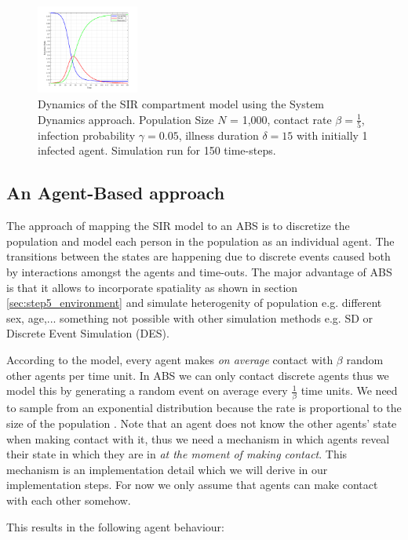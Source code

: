 \begin{figure}
	\centering
	\includegraphics[width=0.3\textwidth, angle=0]{./fig/SD/SIR_SD_1000agents_150t_001dt.png}
	\caption{Dynamics of the SIR compartment model using the System Dynamics approach. Population Size $N$ = 1,000, contact rate $\beta =  \frac{1}{5}$, infection probability $\gamma = 0.05$, illness duration $\delta = 15$ with initially 1 infected agent. Simulation run for 150 time-steps.}
	\label{fig:sir_sd_dynamics}
\end{figure}

\subsection*{An Agent-Based approach}
The approach of mapping the SIR model to an ABS is to discretize the population and model each person in the population as an individual agent. The transitions between the states are happening due to discrete events caused both by interactions amongst the agents and time-outs. The major advantage of ABS is that it allows to incorporate spatiality as shown in section \ref{sec:step5_environment} and simulate heterogenity of population e.g. different sex, age,... something not possible with other simulation methods e.g. SD or Discrete Event Simulation (DES).

According to the model, every agent makes \textit{on average} contact with $\beta$ random other agents per time unit. In ABS we can only contact discrete agents thus we model this by generating a random event on average every $\frac{1}{\beta}$ time units. We need to sample from an exponential distribution because the rate is proportional to the size of the population \cite{borshchev_system_2004}. Note that an agent does not know the other agents' state when making contact with it, thus we need a mechanism in which agents reveal their state in which they are in \textit{at the moment of making contact}. This mechanism is an implementation detail which we will derive in our implementation steps. For now we only assume that agents can make contact with each other somehow.

This results in the following agent behaviour:

